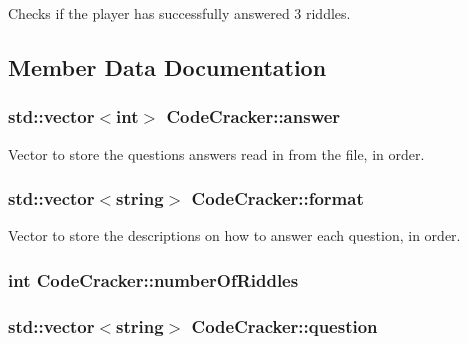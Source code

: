 Checks if the player has successfully answered 3 riddles. 



\subsection{Member Data Documentation}
\hypertarget{classCodeCracker_a2084c27e05ec80c44263cb2f9a54d8c4}{
\subsubsection[{answer}]{\setlength{\rightskip}{0pt plus 5cm}std\-::vector$<$int$>$ Code\-Cracker\-::answer\hspace{0.3cm}{\ttfamily [private]}}}\label{classCodeCracker_a2084c27e05ec80c44263cb2f9a54d8c4}


Vector to store the questions answers read in from the file, in order. 

\hypertarget{classCodeCracker_a6ab76d405fa6a989fdd10c7641f6bc4e}{
\subsubsection[{format}]{\setlength{\rightskip}{0pt plus 5cm}std\-::vector$<$string$>$ Code\-Cracker\-::format\hspace{0.3cm}{\ttfamily [private]}}}\label{classCodeCracker_a6ab76d405fa6a989fdd10c7641f6bc4e}


Vector to store the descriptions on how to answer each question, in order. 

\hypertarget{classCodeCracker_a30671a1b282dc98361938283fbafcf6e}{
\subsubsection[{number\-Of\-Riddles}]{\setlength{\rightskip}{0pt plus 5cm}int Code\-Cracker\-::number\-Of\-Riddles\hspace{0.3cm}{\ttfamily [private]}}}\label{classCodeCracker_a30671a1b282dc98361938283fbafcf6e}
\hypertarget{classCodeCracker_ae578bd328ef64ed314b19e5940247f2c}{
\subsubsection[{question}]{\setlength{\rightskip}{0pt plus 5cm}std\-::vector$<$string$>$ Code\-Cracker\-::question\hspace{0.3cm}{\ttfamily [private]}}}\label{classCodeCracker_ae578bd328ef64ed314b19e5940247f2c}


